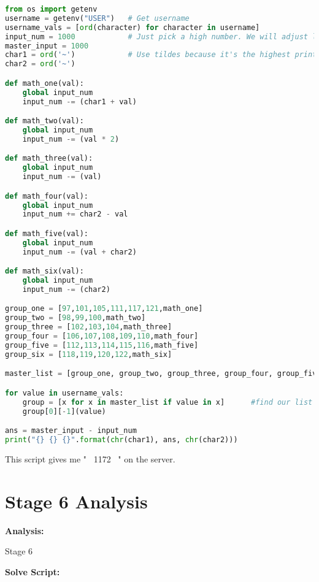 \documentclass{article}
\begin{document}
\begin{lstlisting}[language=Python]
from os import getenv
username = getenv("USER")   # Get username
username_vals = [ord(character) for character in username]
input_num = 1000            # Just pick a high number. We will adjust later
master_input = 1000
char1 = ord('~')            # Use tildes because it's the highest printable ascii val (126)
char2 = ord('~')

def math_one(val):
    global input_num
    input_num -= (char1 + val)

def math_two(val):
    global input_num
    input_num -= (val * 2)

def math_three(val):
    global input_num
    input_num -= (val)

def math_four(val):
    global input_num
    input_num += char2 - val

def math_five(val):
    global input_num
    input_num -= (val + char2)

def math_six(val):
    global input_num
    input_num -= (char2)

group_one = [97,101,105,111,117,121,math_one]
group_two = [98,99,100,math_two]
group_three = [102,103,104,math_three]
group_four = [106,107,108,109,110,math_four]
group_five = [112,113,114,115,116,math_five]
group_six = [118,119,120,122,math_six]

master_list = [group_one, group_two, group_three, group_four, group_five, group_six]

for value in username_vals:
    group = [x for x in master_list if value in x]      #find our list
    group[0][-1](value)

ans = master_input - input_num
print("{} {} {}".format(chr(char1), ans, chr(char2)))
\end{lstlisting}
This script gives me "~ 1172 ~" on the server. 

\newpage
\section{Stage 6 Analysis}
\begin{flushleft}
\vspace{.5pc}
\end{flushleft}

\begin{flushleft}
\textbf{Analysis:}
\vspace{.5pc}
\end{flushleft}
\par
Stage 6
\begin{flushleft}
\textbf{Solve Script:}
\vspace{.5pc}
\end{flushleft}
\par
\end{document}
